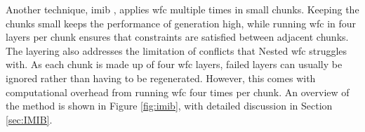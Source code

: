 Another technique, \acrlong{imib} \cite{Infinite_Modifying_In_Blocks}, applies \acrshort{wfc} multiple times in small chunks. Keeping the chunks small keeps the performance of generation high, while running \acrshort{wfc} in four layers per chunk ensures that constraints are satisfied between adjacent chunks. The layering also addresses the limitation of conflicts that Nested \acrshort{wfc} struggles with. As each chunk is made up of four \acrshort{wfc} layers, failed layers can usually be ignored rather than having to be regenerated. However, this comes with computational overhead from running \acrshort{wfc} four times per chunk. An overview of the method is shown in Figure \ref{fig:imib}, with detailed discussion in Section \ref{sec:IMIB}.

\begin{figure}[H]
    \centering
    \hfill

    \vspace{\baselineskip} %


\end{figure}

